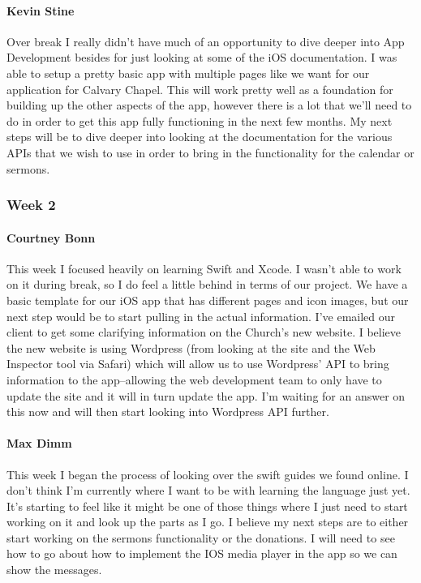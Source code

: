 			\paragraph{Kevin Stine}
			Over break I really didn't have much of an opportunity to dive deeper into App Development besides for just looking at some of the iOS documentation. I was able to setup a pretty basic app with multiple pages like we want for our application for Calvary Chapel. This will work pretty well as a foundation for building up the other aspects of the app, however there is a lot that we'll need to do in order to get this app fully functioning in the next few months. My next steps will be to dive deeper into looking at the documentation for the various APIs that we wish to use in order to bring in the functionality for the calendar or sermons.

		\subsubsection{Week 2}

			\paragraph{Courtney Bonn}
			This week I focused heavily on learning Swift and Xcode. I wasn't able to work on it during break, so I do feel a little behind in terms of our project. We have a basic template for our iOS app that has different pages and icon images, but our next step would be to start pulling in the actual information. I've emailed our client to get some clarifying information on the Church's new website. I believe the new website is using Wordpress (from looking at the site and the Web Inspector tool via Safari) which will allow us to use Wordpress' API to bring information to the app--allowing the web development team to only have to update the site and it will in turn update the app. I'm waiting for an answer on this now and will then start looking into Wordpress API further.

			\paragraph{Max Dimm}
			This week I began the process of looking over the swift guides we found online. I don't think I'm currently where I want to be with learning the language just yet. It's starting to feel like it might be one of those things where I just need to start working on it and look up the parts as I go. I believe my next steps are to either start working on the sermons functionality or the donations. I will need to see how to go about how to implement the IOS media player in the app so we can show the messages.

